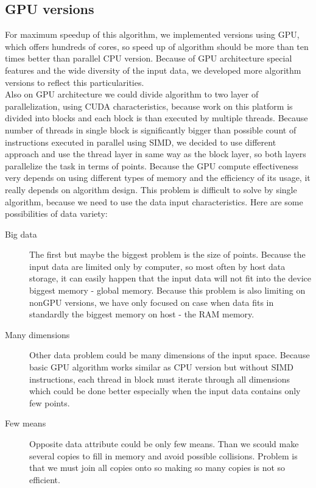 \subsection{GPU versions}
For maximum speedup of this algorithm, we implemented versions using GPU, which offers hundreds of cores, so speed up of algorithm should be more than ten times better than parallel CPU version. Because of GPU architecture special features and the wide diversity of the input data, we developed more algorithm versions to reflect this particularities.\\
Also on GPU architecture we could divide algorithm to two layer of parallelization, using CUDA characteristics, because work on this platform is divided into blocks and each block is than executed by multiple threads. Because number of threads in single block is significantly bigger than possible count of instructions executed in parallel using SIMD, we decided to use different approach and use the thread layer in same way as the block layer, so both layers parallelize the task in terms of points.
Because the GPU compute effectiveness very depends on using different types of memory and the efficiency of its usage, it really depends on algorithm design. This problem is difficult to solve by single algorithm, because we need to use the data input characteristics. Here are some possibilities of data variety:
\begin{description}
\item[Big data] The first but maybe the biggest problem is the size of points. Because the input data are limited only by computer, so most often by host data storage, it can easily happen that the input data will not fit into the device biggest memory - global memory. Because this problem is also limiting on nonGPU versions, we have only focused on case when data fits in standardly the biggest memory on host - the RAM memory.
\item[Many dimensions] Other data problem could be many dimensions of the input space. Because basic GPU algorithm works similar as CPU version but without SIMD instructions, each thread in block must iterate through all dimensions which could be done better especially when the input data contains only few points.
\item[Few means] Opposite data attribute could be only few means. Than we scould make several copies to fill in memory and avoid possible collisions. Problem is that we must join all copies onto so making so many copies is not so efficient.
\end{description}

